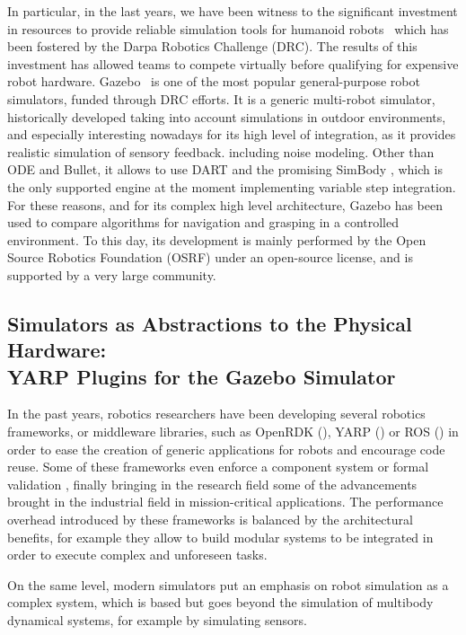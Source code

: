 In particular, in the last years, we have been witness to the significant investment in resources to provide reliable simulation tools for humanoid robots~\cite{Hsu14} which has been fostered by the Darpa Robotics Challenge (DRC). The results of this investment has allowed teams to compete virtually before qualifying for expensive robot hardware.  
Gazebo~\cite{koenig2004design} is one of the most popular general-purpose robot simulators, funded through DRC efforts.
It is a generic multi-robot simulator, historically developed taking into account simulations in outdoor environments, and especially interesting nowadays for its high level of integration, as it provides realistic simulation of sensory feedback. including noise modeling. Other than ODE and Bullet, it allows to use DART \cite{DART} and the promising SimBody \cite{Sherman2011241}, which is the only supported engine at the moment implementing variable step integration. For these reasons, and for its complex high level architecture, Gazebo has been used to compare algorithms for navigation and grasping in a controlled environment.
To this day, its development is mainly performed by the Open Source Robotics Foundation (OSRF) under an open-source license, and is supported by a very large community.

\subsection{Simulators as Abstractions to the Physical Hardware:\\YARP Plugins for the Gazebo Simulator}

In the past years, robotics researchers have been developing several robotics frameworks, or middleware libraries, such as OpenRDK (\cite{cace08rdk}), YARP (\cite{Metta:YARP:2006}) or ROS (\cite{ROS}) in order to ease the creation of generic applications for robots and encourage code reuse. Some of these frameworks even enforce a component system  or formal validation , finally bringing in the research field some of the advancements brought in the industrial field in mission-critical applications. The performance overhead introduced by these frameworks is balanced by the architectural benefits, for example they allow to build modular systems to be integrated in order to execute complex and unforeseen tasks.

On the same level, modern simulators put an emphasis on robot simulation as a complex system, which is based but goes beyond the simulation of multibody dynamical systems, for example by simulating sensors.

